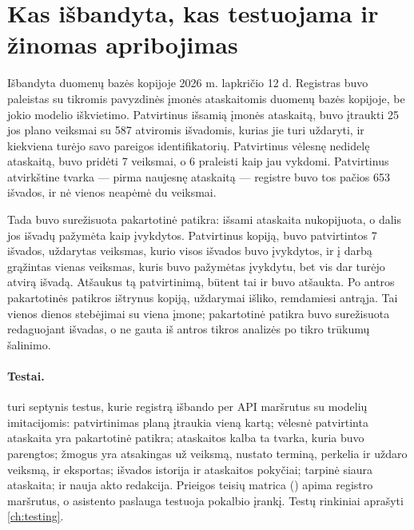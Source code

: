 \section{Kas išbandyta, kas testuojama ir žinomas apribojimas}\label{sec:register:tried}

\begin{lessonbox}{Išbandyta duomenų bazės kopijoje 2026 m. lapkričio 12 d.}
Registras buvo paleistas su tikromis pavyzdinės įmonės \demo{} ataskaitomis duomenų bazės
kopijoje, be jokio modelio iškvietimo. Patvirtinus išsamią įmonės ataskaitą, buvo įtraukti 25 jos
plano veiksmai su 587 atviromis išvadomis, kurias jie turi uždaryti, ir kiekviena turėjo savo
pareigos identifikatorių. Patvirtinus vėlesnę nedidelę ataskaitą, buvo pridėti 7 veiksmai, o 6 praleisti kaip jau vykdomi. Patvirtinus atvirkštine tvarka --- pirma naujesnę ataskaitą --- registre buvo
tos pačios 653 išvados, ir nė vienos neapėmė du veiksmai.

\smallskip
Tada buvo surežisuota pakartotinė patikra: išsami ataskaita nukopijuota, o dalis jos išvadų
pažymėta kaip įvykdytos. Patvirtinus kopiją, buvo patvirtintos 7 išvados, uždarytas veiksmas,
kurio visos išvados buvo įvykdytos, ir į darbą grąžintas vienas veiksmas, kuris buvo pažymėtas
įvykdytu, bet vis dar turėjo atvirą išvadą. Atšaukus tą patvirtinimą, būtent tai ir buvo
atšaukta. Po antros pakartotinės patikros ištrynus kopiją, uždarymai išliko, remdamiesi antrąja.
Tai vienos dienos stebėjimai su viena įmone; pakartotinė patikra buvo surežisuota redaguojant
išvadas, o ne gauta iš antros tikros analizės po tikro trūkumų šalinimo.
\end{lessonbox}

\paragraph{Testai.}  turi septynis testus, kurie registrą išbando
per API maršrutus su modelių imitacijomis: patvirtinimas planą įtraukia vieną kartą; vėlesnė
patvirtinta ataskaita yra pakartotinė patikra; ataskaitos kalba ta tvarka, kuria buvo parengtos;
žmogus yra atsakingas už veiksmą, nustato terminą, perkelia ir uždaro veiksmą, ir eksportas;
išvados istorija ir ataskaitos pokyčiai; tarpinė siaura ataskaita; ir nauja akto redakcija.
Prieigos teisių matrica () apima registro maršrutus, o asistento
paslauga testuoja pokalbio įrankį. Testų rinkiniai aprašyti \cref{ch:testing}.

